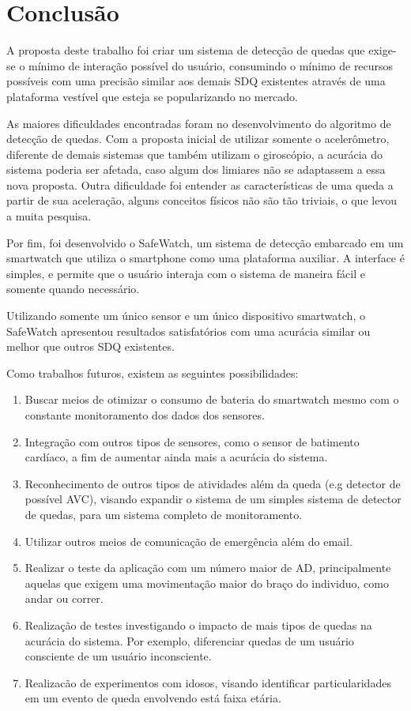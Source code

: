 \chapter{Conclusão}
\label{cap:conclusão}

A proposta deste trabalho foi criar um sistema de detecção de quedas que exige-se o mínimo de interação possível do usuário, consumindo o mínimo de recursos possíveis com uma precisão similar aos demais \ac{SDQ} existentes através de uma plataforma vestível que esteja se popularizando no mercado. 

As maiores dificuldades encontradas foram no desenvolvimento do algoritmo de detecção de quedas. Com a proposta inicial de utilizar somente o acelerômetro, diferente de demais sistemas que também utilizam o giroscópio, a acurácia do sistema poderia ser afetada, caso algum dos limiares não se adaptassem a essa nova proposta. Outra dificuldade foi entender as características de uma queda a partir de sua aceleração, alguns conceitos físicos não são tão triviais, o que levou a muita pesquisa.    

Por fim, foi desenvolvido o SafeWatch, um sistema de detecção embarcado em um smartwatch que utiliza o smartphone como uma plataforma auxiliar. A interface é simples, e permite que o usuário interaja com o sistema de maneira fácil e somente quando necessário.

Utilizando somente um único sensor e um único dispositivo smartwatch, o SafeWatch apresentou resultados satisfatórios com uma acurácia similar ou melhor que outros \ac{SDQ} existentes.


Como trabalhos futuros, existem as seguintes possibilidades:

	\begin{enumerate}
		\item Buscar meios de otimizar o consumo de bateria do smartwatch mesmo com o constante monitoramento dos dados dos sensores.
		\item Integração com outros tipos de sensores, como o sensor de batimento cardíaco, a fim de aumentar ainda mais a acurácia do sistema.
		\item Reconhecimento de outros tipos de atividades além da queda (e.g detector de possível AVC),  visando expandir o sistema de um simples sistema de detector de quedas, para um sistema completo de monitoramento. 
		\item Utilizar outros meios de comunicação de emergência além do email. 
		\item Realizar o teste da aplicação com um número maior de \ac{AD}, principalmente aquelas que exigem uma movimentação maior do braço do individuo, como andar ou correr. 
		\item Realização de testes investigando o impacto de mais tipos de quedas na acurácia do sistema. Por exemplo, diferenciar quedas de um usuário consciente de um usuário inconsciente.
		\item Realizacão de experimentos com idosos, visando identificar particularidades em um evento de queda envolvendo está faixa etária. 
 
	\end{enumerate}



